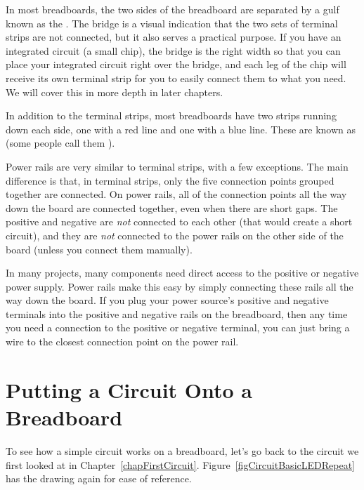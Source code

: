 In most breadboards, the two sides of the breadboard are separated by a gulf known as the .
The bridge is a visual indication that the two sets of terminal strips are not connected, but it also serves a practical purpose.
If you have an integrated circuit (a small chip), the bridge is the right width so that you can place your integrated circuit right over the bridge, and each leg of the chip will receive its own terminal strip for you to easily connect them to what you need.
We will cover this in more depth in later chapters.


In addition to the terminal strips, most breadboards have two strips running down each side, one with a red line and one with a blue line.
These are known as  (some people call them ).  

Power rails are very similar to terminal strips, with a few exceptions.
The main difference is that, in terminal strips, only the five connection points grouped together are connected.
On power rails, all of the connection points all the way down the board are connected together, even when there are short gaps.
The positive and negative are \emph{not} connected to each other (that would create a short circuit), and they are \emph{not} connected to the power rails on the other side of the board (unless you connect them manually).

In many projects, many components need direct access to the positive or negative power supply.
Power rails make this easy by simply connecting these rails all the way down the board.
If you plug your power source's positive and negative terminals into the positive and negative rails on the breadboard, then any time you need a connection to the positive or negative terminal, you can just bring a wire to the closest connection point on the power rail.

\section{Putting a Circuit Onto a Breadboard}

To see how a simple circuit works on a breadboard, let's go back to the circuit we first looked at in Chapter~\ref{chapFirstCircuit}.
Figure~\ref{figCircuitBasicLEDRepeat} has the drawing again for ease of reference.

